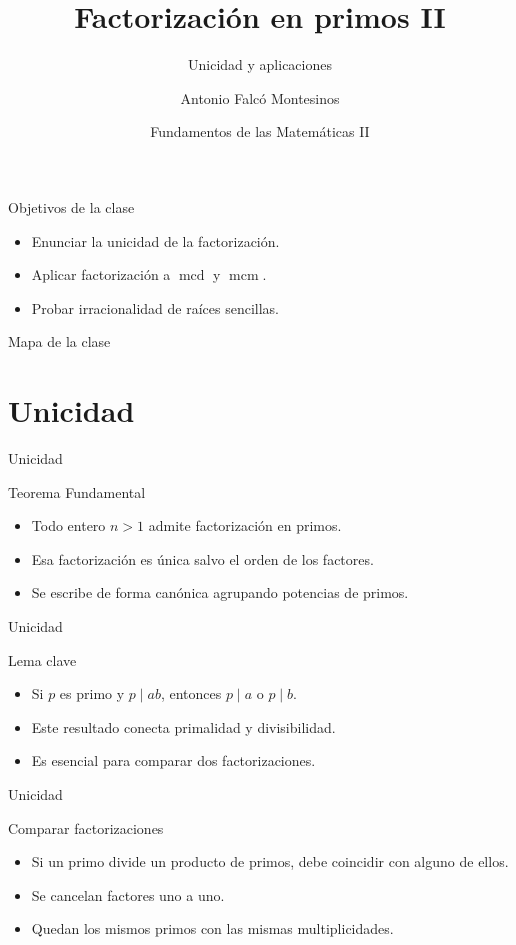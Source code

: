 \documentclass[aspectratio=169,11pt]{beamer}
\title[FdM II -- Clase 08]{Factorización en primos II}
\subtitle{Unicidad y aplicaciones}
\author{Antonio Falcó Montesinos}
\institute{Universidad CEU Cardenal Herrera}
\date{Fundamentos de las Matemáticas II}
\newcommand{\mcd}{\operatorname{mcd}}
\newcommand{\mcm}{\operatorname{mcm}}
\begin{document}
\begin{frame}
  \titlepage
\end{frame}

\begin{frame}{Objetivos de la clase}
\begin{itemize}
  \item Enunciar la unicidad de la factorización.
  \item Aplicar factorización a \(\mcd\) y \(\mcm\).
  \item Probar irracionalidad de raíces sencillas.
\end{itemize}
\end{frame}

\begin{frame}{Mapa de la clase}
\tableofcontents
\end{frame}

\section{Unicidad}

\begin{frame}{Unicidad}
\begin{block}{Teorema Fundamental}
\begin{itemize}
  \item Todo entero \(n>1\) admite factorización en primos.
  \item Esa factorización es única salvo el orden de los factores.
  \item Se escribe de forma canónica agrupando potencias de primos.
\end{itemize}
\end{block}
\end{frame}

\begin{frame}{Unicidad}
\begin{block}{Lema clave}
\begin{itemize}
  \item Si \(p\) es primo y \(p\mid ab\), entonces \(p\mid a\) o \(p\mid b\).
  \item Este resultado conecta primalidad y divisibilidad.
  \item Es esencial para comparar dos factorizaciones.
\end{itemize}
\end{block}
\end{frame}

\begin{frame}{Unicidad}
\begin{block}{Comparar factorizaciones}
\begin{itemize}
  \item Si un primo divide un producto de primos, debe coincidir con alguno de ellos.
  \item Se cancelan factores uno a uno.
  \item Quedan los mismos primos con las mismas multiplicidades.
\end{itemize}
\end{block}
\end{frame}
\end{document}

